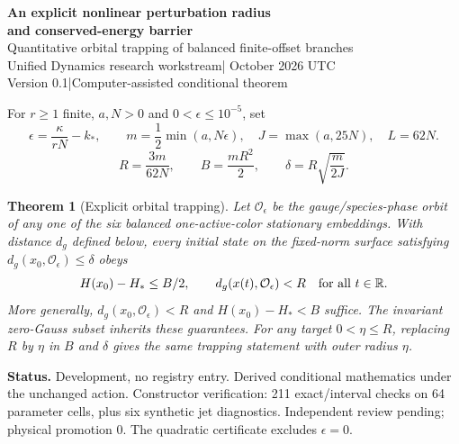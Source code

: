 \documentclass[11pt,a4paper]{article}
\newtheorem{theorem}{Theorem}\newtheorem{lemma}[theorem]{Lemma}
\begin{document}
\begin{center}
{\Large\bfseries An explicit nonlinear perturbation radius\\and conserved-energy barrier}\\[10pt]
{\large Quantitative orbital trapping of balanced finite-offset branches}\\[10pt]
Unified Dynamics research workstream\quad | October 2026 UTC\\
Version 0.1\quad |\quad Computer-assisted conditional theorem
\end{center}
\begin{abstract}
We make the preceding local stability theorem quantitative. On a specified product Riemannian metric, 64 rigorous interval cells certify a scalar Schur-complement floor proportional to the positive offset. The full orbit-normal quadratic energy then has a simple lower bound at every finite rank. Global second and third geodesic derivative estimates for the frozen Hamiltonian give an explicit trapping radius, boundary energy barrier and smaller initial ball guaranteed to remain inside that radius for all time. No smoothness of the final gauge quotient or unspecified continuity neighborhood is required. The resulting radii are conservative mathematical guarantees, not maximal basins or physically calibrated tolerances.
\end{abstract}
For $r\ge1$ finite, $a,N>0$ and $0<\epsilon\le10^{-5}$, set
\[
\epsilon=\frac\kappa{rN}-k_*,\qquad
m=\frac12\min(a,N\epsilon),\quad J=\max(a,25N),\quad L=62N.
\]
\[
\boxed{R=\frac{3m}{62N},\qquad B=\frac{mR^2}{2},\qquad
\delta=R\sqrt{\frac{m}{2J}}.}
\]
\begin{theorem}[Explicit orbital trapping]\label{th:main}
Let $\mathcal O_\epsilon$ be the gauge/species-phase orbit of any one of the six balanced one-active-color stationary embeddings. With distance $d_g$ defined below, every initial state on the fixed-norm surface satisfying $d_g(x_0,\mathcal O_\epsilon)\le\delta$ obeys
\[
H(x_0)-H_*\le B/2,\qquad d_g(x(t),\mathcal O_\epsilon)<R
\quad\hbox{for all }t\in\mathbb R.
\]
More generally, $d_g(x_0,\mathcal O_\epsilon)<R$ and $H(x_0)-H_*<B$ suffice. The invariant zero-Gauss subset inherits these guarantees. For any target $0<\eta\le R$, replacing $R$ by $\eta$ in $B$ and $\delta$ gives the same trapping statement with outer radius $\eta$.
\end{theorem}
\textbf{Status.} Development, no registry entry. Derived conditional mathematics under the unchanged action. Constructor verification: 211 exact/interval checks on 64 parameter cells, plus six synthetic jet diagnostics. Independent review pending; physical promotion $0$. The quadratic certificate excludes $\epsilon=0$.
\newpage
\end{document}
